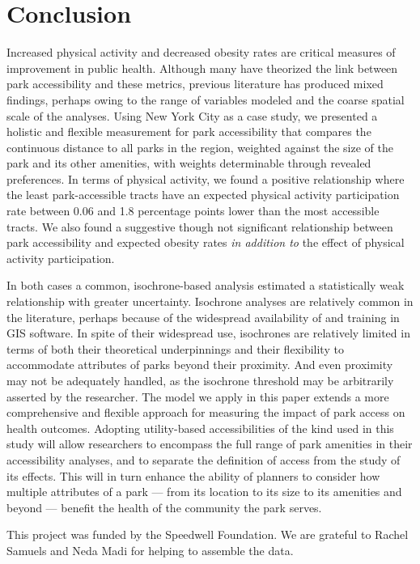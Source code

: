 \documentclass[shortAfour,sageh.bst]{sagej}
\begin{document}
\hypertarget{conclusion}{%
\section{Conclusion}\label{conclusion}}

Increased physical activity and decreased obesity rates are critical
measures of improvement in public health. Although many have theorized
the link between park accessibility and these metrics, previous
literature has produced mixed findings, perhaps owing to the range of
variables modeled and the coarse spatial scale of the analyses. Using
New York City as a case study, we presented a holistic and flexible
measurement for park accessibility that compares the continuous distance
to all parks in the region, weighted against the size of the park and
its other amenities, with weights determinable through revealed
preferences. In terms of physical activity, we found a positive
relationship where the least park-accessible tracts have an expected
physical activity participation rate between 0.06 and 1.8 percentage
points lower than the most accessible tracts. We also found a suggestive
though not significant relationship between park accessibility and
expected obesity rates \emph{in addition to} the effect of physical
activity participation.

In both cases a common, isochrone-based analysis estimated a
statistically weak relationship with greater uncertainty. Isochrone
analyses are relatively common in the literature, perhaps because of the
widespread availability of and training in GIS software. In spite of
their widespread use, isochrones are relatively limited in terms of both
their theoretical underpinnings and their flexibility to accommodate
attributes of parks beyond their proximity. And even proximity may not
be adequately handled, as the isochrone threshold may be arbitrarily
asserted by the researcher. The model we apply in this paper extends a
more comprehensive and flexible approach for measuring the impact of
park access on health outcomes. Adopting utility-based accessibilities
of the kind used in this study will allow researchers to encompass the
full range of park amenities in their accessibility analyses, and to
separate the definition of access from the study of its effects. This
will in turn enhance the ability of planners to consider how multiple
attributes of a park --- from its location to its size to its amenities
and beyond --- benefit the health of the community the park serves.

\begin{acks}
This project was funded by the Speedwell Foundation. We are grateful to Rachel
Samuels and Neda Madi for helping to assemble the data.
\end{acks}
\end{document}
